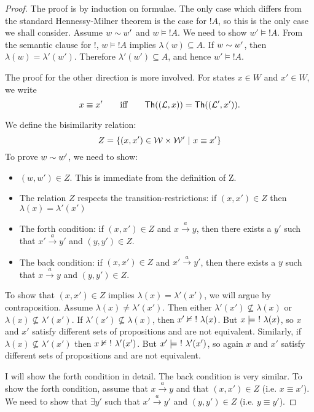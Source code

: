 \begin{proof}
The proof is by induction on formulae.  The only case which differs
from the standard Hennessy-Milner theorem is the case for $!A$, so
this is the only case we shall consider.  Assume $w \sim w'$ and $w
\models !A$. We need to show $w' \models !A$.
From the semantic clause for $!$, $w \models !A$ implies $\lambda(w)
\subseteq A$.  If $w \sim w'$, then $\lambda(w) = \lambda'(w')$.
Therefore $\lambda'(w') \subseteq A$, and hence $w' \models !A$.

The proof for the other direction is more involved.
For states $x \in W$ and $x' \in W$, we write 
\[
   x \equiv x'
      \qquad\text{iff}\qquad
   \mathsf{Th}((\mathcal{L}, x)) = \mathsf{Th}((\mathcal{L}', x')).
\]

We define the bisimilarity relation:
\[
   Z = \{(x,x') \in \mathcal{W} \times \mathcal{W}' \ | \  x \equiv x' \}
\]
To prove $w \sim w'$, we need to show:
\begin{itemize}

\item $(w,w') \in Z$. This is immediate from the definition of Z.

\item The relation $Z$ respects the transition-restrictions: if
  $(x,x') \in Z$ then $\lambda(x) = \lambda'(x')$

\item The forth condition: if $(x,x') \in Z$ and $x \xrightarrow{a}
  y$, then there exists a $y'$ such that $x' \xrightarrow{a} y'$ and $(y, y') \in Z$.

\item The back condition: if $(x,x') \in Z$ and $x' \xrightarrow{a}
  y'$, then there exists a $y$ such that $x \xrightarrow{a} y$ and $(y, y') \in Z$.

\end{itemize}
To show that $(x,x') \in Z$ implies $\lambda(x) = \lambda'(x')$, we will argue by contraposition.
Assume $\lambda(x) \neq \lambda'(x')$.
Then either $\lambda'(x') \nsubseteq  \lambda(x)$ or $\lambda(x) \nsubseteq  \lambda'(x')$.
If $\lambda'(x') \nsubseteq  \lambda(x)$, then $x' \nvDash \ ! \  \lambda(x)$.
But $x \models \ ! \  \lambda(x)$, so $x$ and $x'$ satisfy different sets of propositions and are not equivalent.
Similarly, if $\lambda(x) \nsubseteq  \lambda'(x')$ then $x \nvDash \ ! \  \lambda'(x')$.
But $x' \models \ ! \  \lambda'(x')$, so again $x$ and $x'$ satisfy different sets of propositions and are not equivalent.

I will show the forth condition in detail. The back condition is very similar.
To show the forth condition, assume that  $x \xrightarrow{a} y$ and that $(x,x') \in Z$ (i.e. $x \equiv x'$).
We need to show that $\exists y'$ such that $x' \xrightarrow{a} y'$ and $(y,y') \in Z$ (i.e. $y \equiv y'$).


\end{proof}
